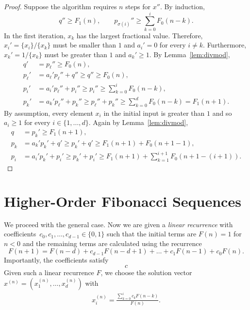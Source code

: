 \begin{proof}
  Suppose the algorithm requires $n$ steps for $x''$.
  By induction,
  \[
    q'' ≥ F_1(n),
    \qquad
    p_{σ(i)}'' ≥ ∑_{k=0}^i F_0(n - k).
  \]
  In the first iteration,
  $x_k$ has the largest fractional value.
  Therefore, $x_i' = \{x_i\}/\{x_k\}$ must be smaller than $1$ and $a_i' = 0$ for every $i ≠ k$.
  Furthermore, $x_k' = 1/\{x_k\}$ must be greater than $1$ and $a_k' ≥ 1$.
  By Lemma~\ref{lem:divmod},
  \begin{align*}
    q' & = p_ℓ'' ≥ F_0(n), \\
    p_ℓ' & = a_ℓ' p_ℓ'' + q'' ≥ q'' ≥ F_0(n), \\
    p_i' & = a_i' p_ℓ'' + p_i'' ≥ p_i'' ≥ \sum_{k=0}^i F_0(n - k), \\
    p_k' & = a_k' p_ℓ'' + p_k'' ≥ p_ℓ'' + p_k'' ≥ \sum_{k=0}^d F_0(n - k) = F_1(n+1).
  \end{align*}
  By assumption, every element $x_i$ in the initial input is greater than $1$ and
  so $a_i ≥ 1$ for every $i ∈ \{1, …, d\}$.
  Again by Lemma~\ref{lem:divmod},
  \begin{align*}
    q & = p_k' ≥ F_1(n + 1), \\
    p_k & = a_k' p_k' + q' ≥ p_k' + q' ≥ F_1(n+1) + F_0(n + 1 - 1), \\
    p_i & = a_i' p_k' + p_i' ≥ p_k' + p_i' ≥ F_1(n+1) + \sum_{k=1}^{i+1} F_0(n+1 - (i+1)).
  \end{align*}
\end{proof}


\section{Higher-Order Fibonacci Sequences}


We proceed with the general case.
Now we are given a \emph{linear recurrence} with coefficients~$c_0, c_1, \dots, c_{d-1} ∈ \{0, 1\}$ such that
the initial terms are $F(n) = 1$ for $n < 0$ and
the remaining terms are calculated using the recurrence
\[
  F(n + 1) = F(n - d) + c_{d-1} F(n - d + 1) + \dots + c_1 F(n - 1) + c_0 F(n).
\]
Importantly, the coefficients satisfy
\[
  c
\]
Given such a linear recurrence $F$, we choose the solution vector $x^{(n)} = (x_1^{(n)}, …, x_d^{(n)})$ with
\begin{align*}
  x_i^{(n)} = \frac{\sum_{k=0}^i c_k F(n - k)}{F(n)}.
\end{align*}

